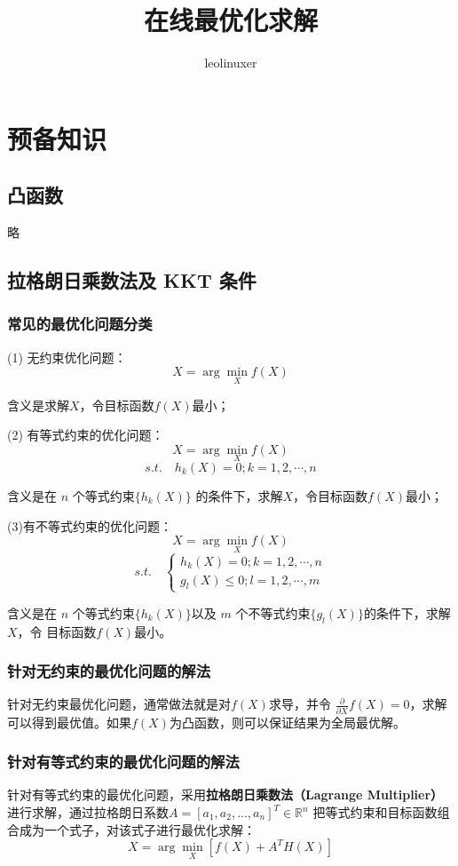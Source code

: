 \documentclass[12pt]{article}
\title{在线最优化求解\cite{Online_Optimization}}
\author{leolinuxer}
\begin{document}
\maketitle
\tableofcontents

\section{预备知识}
\subsection{凸函数}
略

\subsection{拉格朗日乘数法及 KKT 条件}
\subsubsection{常见的最优化问题分类}
(1) 无约束优化问题：
$$
X = \arg\min_Xf(X)
$$

含义是求解$X$，令目标函数$f(X)$最小；

(2) 有等式约束的优化问题：
$$
X = \arg\min_Xf(X)
$$
$$
s.t. \quad h_k(X) = 0; k = 1, 2, \cdots, n
$$

含义是在 $n$ 个等式约束$\{h_k(X)\}$ 的条件下，求解$X$，令目标函数$f(X)$最小；

(3)有不等式约束的优化问题：
$$
X = \arg\min_Xf(X)
$$
$$
s.t. \quad \begin{cases}
h_k(X) = 0; k = 1, 2, \cdots, n \\
g_l(X) \le 0; l = 1, 2, \cdots, m 
\end{cases}
$$

含义是在 $n$ 个等式约束$\{h_k(X)\}$以及 $m$ 个不等式约束$\{g_l(X)\}$的条件下，求解$X$，令 目标函数$f(X)$最小。

\subsubsection{针对无约束的最优化问题的解法}
针对无约束最优化问题，通常做法就是对$f(X)$求导，并令 $\frac{\partial }{\partial X}f(X) = 0$，求解可以得到最优值。如果$f(X)$为凸函数，则可以保证结果为全局最优解。

\subsubsection{针对有等式约束的最优化问题的解法}
针对有等式约束的最优化问题，采用\textbf{拉格朗日乘数法（Lagrange Multiplier）} 进行求解，通过拉格朗日系数$A = [a_1 , a_2, … , a_n ]^T \in \mathbb{R}^n $ 把等式约束和目标函数组合成为一个式子，对该式子进行最优化求解：
$$
X = \arg\min_X[f(X) + A^TH(X)]
$$
\end{document}
